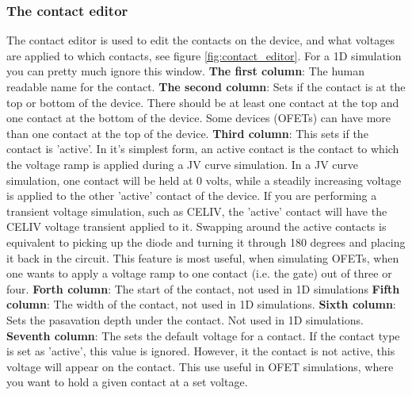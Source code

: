 \subsubsection{The contact editor}

The contact editor is used to edit the contacts on the device, and what voltages are applied to which contacts, see figure \ref{fig:contact_editor}.  For a 1D simulation you can pretty much ignore this window.
\linebreak
\linebreak 
\textbf{The first column}: The human readable name for the contact.
\linebreak 
\linebreak 
\textbf{The second column}: Sets if the contact is at the top or bottom of the device.  There should be at least one contact at the top and one contact at the bottom of the device.  Some devices (OFETs) can have more than one contact at the top of the device. 
\linebreak
\linebreak 
\textbf{Third column}: This sets if the contact is 'active'.  In it's simplest form, an active contact is the contact to which the voltage ramp is applied during a JV curve simulation.  In a JV curve simulation, one contact will be held at 0 volts, while a steadily increasing voltage is applied to the other 'active' contact of the device.  If you are performing a transient voltage simulation, such as CELIV, the 'active' contact will have the CELIV voltage transient applied to it.  Swapping around the active contacts is equivalent to picking up the diode and turning it through 180 degrees and placing it back in the circuit.  This feature is most useful, when simulating OFETs, when one wants to apply a voltage ramp to one contact (i.e. the gate) out of three or four.
\linebreak
\linebreak 
\textbf{Forth column}: The start of the contact, not used in 1D simulations
\linebreak
\linebreak 
\textbf{Fifth column}: The width of the contact, not used in 1D simulations.
\linebreak
\linebreak
\textbf{Sixth column}: Sets the pasavation depth under the contact. Not used in 1D simulations.
\linebreak
\linebreak  
\textbf{Seventh column}: The sets the default voltage for a contact.  If the contact type is set as 'active', this value is ignored.  However, it the contact is not active, this voltage will appear on the contact.  This use useful in OFET simulations, where you want to hold a given contact at a set voltage. 
\linebreak
\linebreak  


